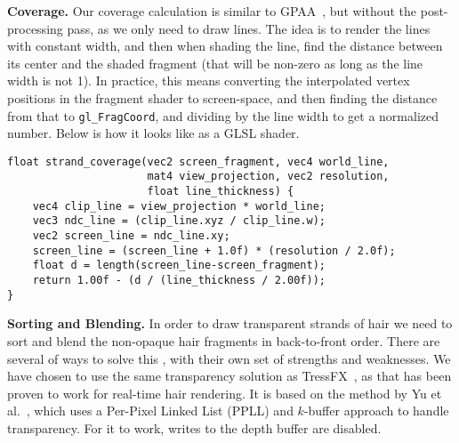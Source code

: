 \documentclass{egpubl}
\begin{document}

\noindent \textbf{Coverage. } Our coverage calculation is similar to GPAA~\cite{persson2012geometric}, but without the post-processing pass, as we only need to draw lines. The idea is to render the lines with constant width, and then when shading the line, find the distance between its center and the shaded fragment (that will be non-zero as long as the line width is not 1). In practice, this means converting the interpolated vertex positions in the fragment shader to screen-space, and then finding the distance from that to \texttt{gl\_FragCoord}, and dividing by the line width to get a normalized number. Below is how it looks like as a GLSL shader.

  \vspace{+0.8em}

\begin{lstlisting}
float strand_coverage(vec2 screen_fragment, vec4 world_line,
                      mat4 view_projection, vec2 resolution,
                      float line_thickness) {
    vec4 clip_line = view_projection * world_line;
    vec3 ndc_line = (clip_line.xyz / clip_line.w);
    vec2 screen_line = ndc_line.xy;
    screen_line = (screen_line + 1.0f) * (resolution / 2.0f);
    float d = length(screen_line-screen_fragment);
    return 1.00f - (d / (line_thickness / 2.00f));
}
\end{lstlisting}


\noindent \textbf{Sorting and Blending. } In order to draw transparent strands of hair we need to sort and blend the non-opaque hair fragments in back-to-front order. There are several of ways to solve this \cite{maule2011survey}, with their own set of strengths and weaknesses. We have chosen to use the same transparency solution as TressFX~\cite{martin2014tressfx}, as that has been proven to work for real-time hair rendering. It is based on the method by Yu et al.~\cite{yu2012framework}, which uses a Per-Pixel Linked List (PPLL) \cite{yang2010real} and $k$-buffer approach \cite{bavoil2007multi} to handle transparency. For it to work, writes to the depth buffer are disabled.
\end{document}
